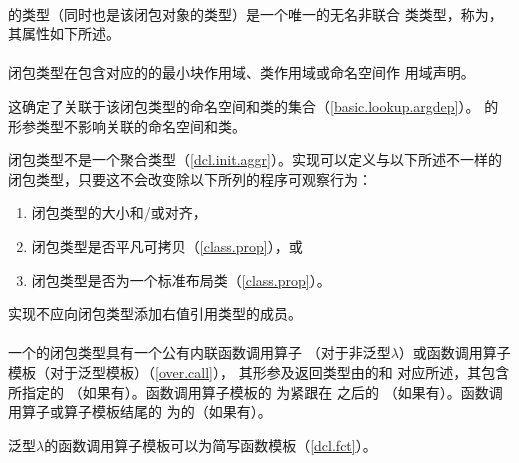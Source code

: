 \paragraph{} %
的类型（同时也是该闭包对象的类型）是一个唯一的无名非联合
类类型，称为，其属性如下所述。

\paragraph{} %
闭包类型在包含对应的的最小块作用域、类作用域或命名空间作
用域声明。

\begin{note}
  这确定了关联于该闭包类型的命名空间和类的集合（\ref{basic.lookup.argdep}）。
  的形参类型不影响关联的命名空间和类。
\end{note}

闭包类型不是一个聚合类型（\ref{dcl.init.aggr}）。实现可以定义与以下所述不一样的
闭包类型，只要这不会改变除以下所列的程序可观察行为：
\begin{enumerate}
  \item 闭包类型的大小和/或对齐，
  \item 闭包类型是否平凡可拷贝（\ref{class.prop}），或
  \item 闭包类型是否为一个标准布局类（\ref{class.prop}）。
\end{enumerate}

实现不应向闭包类型添加右值引用类型的成员。

\paragraph{} %
一个的闭包类型具有一个公有内联函数调用算子
（对于非泛型$\lambda$）或函数调用算子模板（对于泛型模板）（\ref{over.call}），
其形参及返回类型由的和
对应所述，其包含所指定的
（如果有）。函数调用算子模板的
为紧跟在\tm{<}  \tm{>}之后的
（如果有）。函数调用算子或算子模板结尾的
为的（如果有）。

\begin{note}
  泛型$\lambda$的函数调用算子模板可以为简写函数模板（\ref{dcl.fct}）。
\end{note}

